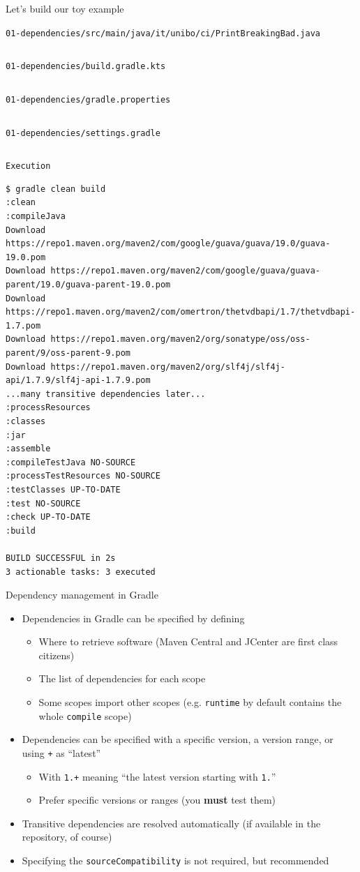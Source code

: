 \documentclass[presentation]{beamer}
\newcommand{\codefile}[3]{
	\begin{block}{\texttt{#1}}
		\inputminted[fontsize=#2,linenos=true,breaklines=true]{#3}{workspace/#1}
	\end{block}
}
\newcommand{\java}[2]{\codefile{#1}{#2}{java}}
\newcommand{\groovy}[2]{\codefile{#1}{#2}{groovy}}
\begin{document}
\begin{frame}{Let's build our toy example}
	\java{01-dependencies/src/main/java/it/unibo/ci/PrintBreakingBad.java}{\tiny}
	\groovy{01-dependencies/build.gradle.kts}{\scriptsize}
	\groovy{01-dependencies/gradle.properties}{\scriptsize}
	\groovy{01-dependencies/settings.gradle}{\scriptsize}
	\begin{block}{\texttt{Execution}}
		\begin{verbatim}
$ gradle clean build
:clean
:compileJava
Download https://repo1.maven.org/maven2/com/google/guava/guava/19.0/guava-19.0.pom
Download https://repo1.maven.org/maven2/com/google/guava/guava-parent/19.0/guava-parent-19.0.pom
Download https://repo1.maven.org/maven2/com/omertron/thetvdbapi/1.7/thetvdbapi-1.7.pom
Download https://repo1.maven.org/maven2/org/sonatype/oss/oss-parent/9/oss-parent-9.pom
Download https://repo1.maven.org/maven2/org/slf4j/slf4j-api/1.7.9/slf4j-api-1.7.9.pom
...many transitive dependencies later...
:processResources
:classes
:jar
:assemble
:compileTestJava NO-SOURCE
:processTestResources NO-SOURCE
:testClasses UP-TO-DATE
:test NO-SOURCE
:check UP-TO-DATE
:build

BUILD SUCCESSFUL in 2s
3 actionable tasks: 3 executed
		\end{verbatim}
	\end{block}
\end{frame}

\begin{frame}[fragile]{Dependency management in Gradle}
	\begin{itemize}
		\item Dependencies in Gradle can be specified by defining
		\begin{itemize}
			\item Where to retrieve software (Maven Central and JCenter are first class citizens)
			\item The list of dependencies for each scope
			\item Some scopes import other scopes (e.g. \texttt{runtime} by default contains the whole \texttt{compile} scope)
		\end{itemize}
		\item Dependencies can be specified with a specific version, a version range, or using \texttt{+} as ``latest''
		\begin{itemize}
			\item With \texttt{1.+} meaning ``the latest version starting with \texttt{1.}''
			\item Prefer specific versions or ranges (you \textbf{must} test them)
		\end{itemize}
		\item Transitive dependencies are resolved automatically (if available in the repository, of course)
		\item Specifying the \texttt{sourceCompatibility} is not required, but recommended
	\end{itemize}
\end{frame}
\end{document}

